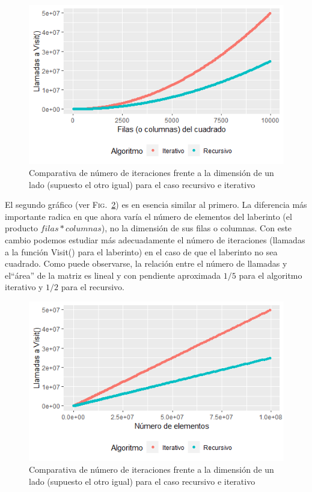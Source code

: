 \documentclass[12pt,a4paper]{article}
\begin{document}
\vspace{0.2cm}
\begin{figure}[h]
	\centering
	\includegraphics[scale=0.9]{fotos/Iteraciones_vs_filas1.png}
	\caption{Comparativa de número de iteraciones frente a la dimensión de un lado (supuesto el otro igual) para el caso recursivo e iterativo}
	\label{grafico1}
\end{figure}

El segundo gráfico (ver \textsc{Fig.}~\ref{grafico2}) es en esencia similar al primero. La diferencia más importante radica en que ahora varía el número de elementos del laberinto (el producto $filas*columnas$), no la dimensión de sus filas o columnas. Con este cambio podemos estudiar más adecuadamente el número de iteraciones (llamadas a la función \textsf{Visit()} para el laberinto) en el caso de que el laberinto no sea cuadrado. Como puede observarse, la relación entre el número de llamadas y el``área'' de la matriz es lineal y con pendiente aproximada $1/5$ para el algoritmo iterativo y $1/2$ para el recursivo.
\begin{figure}[h]
	\centering
	\includegraphics[scale=0.9]{fotos/Iteraciones_vs_numElem1.png}
	\caption{Comparativa de número de iteraciones frente a la dimensión de un lado (supuesto el otro igual) para el caso recursivo e iterativo}
	\label{grafico2}
\end{figure}
\vspace{0.2cm}
\end{document}
